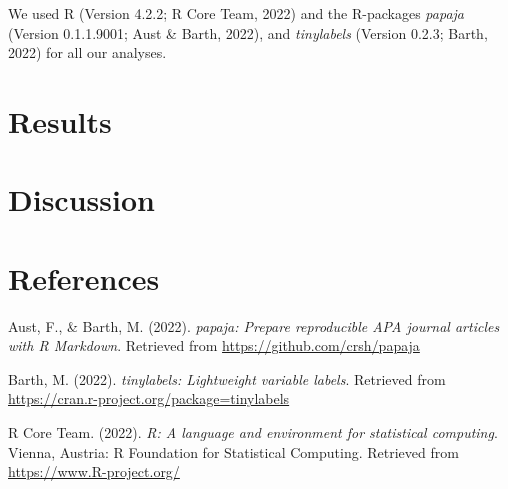 \documentclass[
  man]{apa6}
\newlength{\cslhangindent}
\newlength{\cslentryspacingunit} %
\newenvironment{CSLReferences}[2] %
 {%
  \setlength{\parindent}{0pt}
  \ifodd #1
  \let\oldpar\par
  \def\par{\hangindent=\cslhangindent\oldpar}
  \fi
  \setlength{\parskip}{#2\cslentryspacingunit}
 }%
 {}
\begin{document}
We used R (Version 4.2.2; R Core Team, 2022) and the R-packages \emph{papaja} (Version 0.1.1.9001; Aust \& Barth, 2022), and \emph{tinylabels} (Version 0.2.3; Barth, 2022) for all our analyses.

\hypertarget{results}{%
\section{Results}\label{results}}

\hypertarget{discussion}{%
\section{Discussion}\label{discussion}}

\newpage

\hypertarget{references}{%
\section{References}\label{references}}

\hypertarget{refs}{}
\begin{CSLReferences}{1}{0}
\leavevmode{}%
Aust, F., \& Barth, M. (2022). \emph{{papaja}: {Prepare} reproducible {APA} journal articles with {R Markdown}}. Retrieved from \url{https://github.com/crsh/papaja}

\leavevmode{}%
Barth, M. (2022). \emph{{tinylabels}: Lightweight variable labels}. Retrieved from \url{https://cran.r-project.org/package=tinylabels}

\leavevmode{}%
R Core Team. (2022). \emph{R: A language and environment for statistical computing}. Vienna, Austria: R Foundation for Statistical Computing. Retrieved from \url{https://www.R-project.org/}

\end{CSLReferences}
\end{document}

